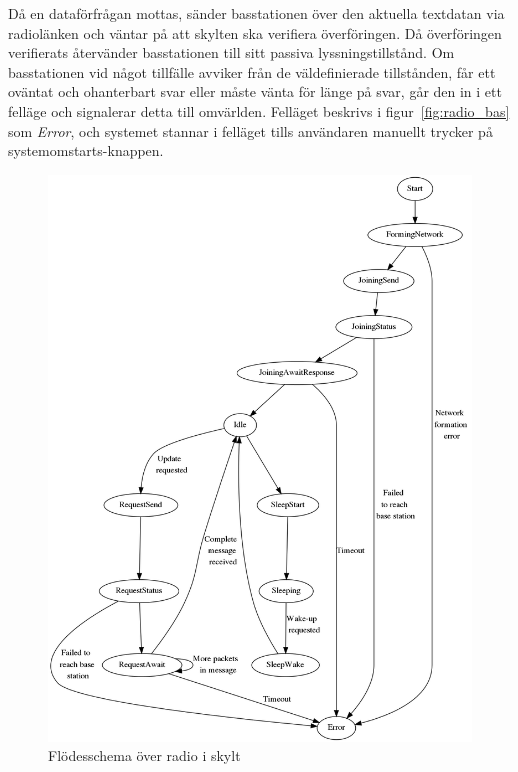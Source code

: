 \documentclass[a4paper,11pt]{article}
\begin{document}
Då en dataförfrågan mottas, sänder basstationen över den aktuella textdatan via radiolänken och väntar på att skylten ska verifiera överföringen. Då överföringen verifierats återvänder basstationen till sitt passiva lyssningstillstånd. Om basstationen vid något tillfälle avviker från de väldefinierade tillstånden, får ett oväntat och ohanterbart svar eller måste vänta för länge på svar, går den in i ett felläge och signalerar detta till omvärlden. Felläget beskrivs i figur~\ref{fig:radio_bas} som {\it Error}, och systemet stannar i felläget tills användaren manuellt trycker på systemomstarts-knappen. \\

\begin{figure}[H]
\begin{center}
\includegraphics[scale=0.35, angle=0]{skyltFSM.png}
\end{center}
\caption{Flödesschema över radio i skylt}
\label{fig:radio_skylt}
\end{figure}
\end{document}
